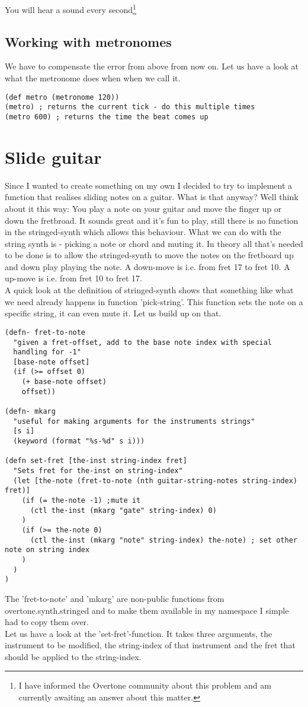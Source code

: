 You will hear a sound every second\footnote{I have informed the Overtone community about this problem and am currently awaiting an answer about this matter.}

\subsection{Working with metronomes}
We have to compensate the error from above from now on. Let us have a look at what the metronome does when when we call it.
\begin{lstlisting}
(def metro (metronome 120))
(metro) ; returns the current tick - do this multiple times
(metro 600) ; returns the time the beat comes up
\end{lstlisting}

\section{Slide guitar}
Since I wanted to create something on my own I decided to try to implement a function that realises sliding notes on a guitar. What is that anyway? Well think about it this way: You play a note on your guitar and move the finger up or down the fretbroad. It sounds great and it's fun to play, still there is no function in the stringed-synth which allows this behaviour. What we can do with the string synth is - picking a note or chord and muting it. In theory all that's needed to be done is to allow the stringed-synth to move the notes on the fretboard up and down play playing the note.
A down-move is i.e. from fret 17 to fret 10. A up-move is i.e. from fret 10 to fret 17.\\

A quick look at the definition of stringed-synth shows that something like what we need already happens in function 'pick-string'. This function sets the note on a specific string, it can even mute it. Let us build up on that.

\begin{lstlisting}
(defn- fret-to-note
  "given a fret-offset, add to the base note index with special
  handling for -1"
  [base-note offset]
  (if (>= offset 0)
    (+ base-note offset)
    offset))

(defn- mkarg
  "useful for making arguments for the instruments strings"
  [s i]
  (keyword (format "%s-%d" s i)))

(defn set-fret [the-inst string-index fret]
  "Sets fret for the-inst on string-index"
  (let [the-note (fret-to-note (nth guitar-string-notes string-index) fret)]
    (if (= the-note -1) ;mute it
      (ctl the-inst (mkarg "gate" string-index) 0)
    )
    (if (>= the-note 0)
      (ctl the-inst (mkarg "note" string-index) the-note) ; set other note on string index
    )
  )
)
\end{lstlisting}
The 'fret-to-note' and 'mkarg' are non-public functions from overtone.synth.stringed and to make them available in my namespace I simple had to copy them over.\\
Let us have a look at the 'set-fret'-function. It takes three arguments, the instrument to be modified, the string-index of that instrument and the fret that should be applied to the string-index.


